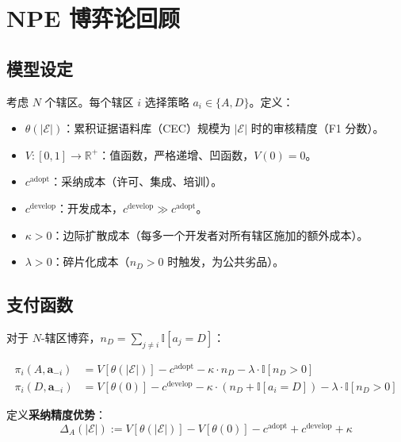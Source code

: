 \documentclass[12pt,a4paper]{article}
\theoremstyle{definition}
\theoremstyle{remark}
\newcommand{\R}{\mathbb{R}}
\newcommand{\Ind}{\mathbb{I}}
\begin{document}
\section{NPE 博弈论回顾}

\subsection{模型设定}

考虑 $N$ 个辖区。每个辖区 $i$ 选择策略 $a_i \in \{A, D\}$。定义：
\begin{itemize}
    \item $\theta(|\mathcal{E}|)$：累积证据语料库（CEC）规模为 $|\mathcal{E}|$ 时的审核精度（F1 分数）。
    \item $V: [0,1] \to \R^+$：值函数，严格递增、凹函数，$V(0)=0$。
    \item $c^{\text{adopt}}$：采纳成本（许可、集成、培训）。
    \item $c^{\text{develop}}$：开发成本，$c^{\text{develop}} \gg c^{\text{adopt}}$。
    \item $\kappa > 0$：边际扩散成本（每多一个开发者对所有辖区施加的额外成本）。
    \item $\lambda > 0$：碎片化成本（$n_D > 0$ 时触发，为公共劣品）。
\end{itemize}

\subsection{支付函数}

对于 $N$-辖区博弈，$n_D = \sum_{j \neq i} \Ind[a_j = D]$：

\begin{align}
    \pi_i(A, \mathbf{a}_{-i}) &= V[\theta(|\mathcal{E}|)] - c^{\text{adopt}} - \kappa \cdot n_D - \lambda \cdot \Ind[n_D > 0] \label{eq:pi_A} \\
    \pi_i(D, \mathbf{a}_{-i}) &= V[\theta(0)] - c^{\text{develop}} - \kappa \cdot (n_D + \Ind[a_i = D]) - \lambda \cdot \Ind[n_D > 0] \label{eq:pi_D}
\end{align}

定义\textbf{采纳精度优势}：
\begin{equation}
    \Delta_A(|\mathcal{E}|) := V[\theta(|\mathcal{E}|)] - V[\theta(0)] - c^{\text{adopt}} + c^{\text{develop}} + \kappa \label{eq:Delta_A}
\end{equation}
\end{document}
